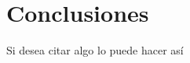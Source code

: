 \documentclass[12pt,letterpaper]{report}
\begin{document}
\section{Conclusiones}

Si desea citar algo lo puede hacer así \cite{margolis2020arduino}


\appendix






\end{document}
